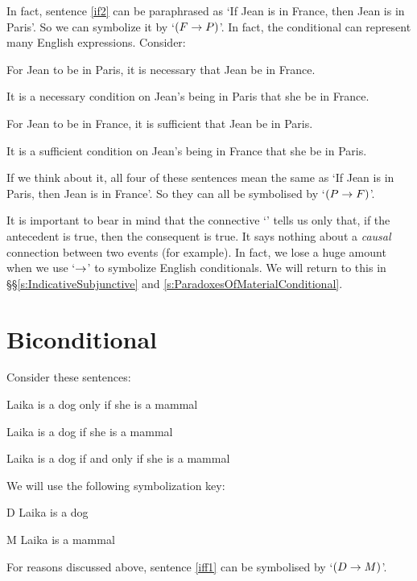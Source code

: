 In fact, sentence \ref{if2} can be paraphrased as `If Jean is in France, then Jean is in Paris'. So we can symbolize it by `$(F \rightarrow P)$'.
\noindent In fact, the conditional can represent many English expressions. Consider: 	\begin{earg}
		\item[\ex{ifnec1}] For Jean to be in Paris, it is necessary that Jean be in France.
		\item[\ex{ifnec2}] It is a necessary condition on Jean's being in Paris that she be in France.
		\item[\ex{ifsuf1}] For Jean to be in France, it is sufficient that Jean be in Paris.
		\item[\ex{ifsuf2}] It is a sufficient condition on Jean's being in France that she be in Paris.
	\end{earg}
If we think about it, all four of these sentences mean the same as  `If Jean is in Paris, then Jean is in France'. So they can all be symbolised by `$(P \rightarrow F)$'.

It is important to bear in mind that the connective `\eif' tells us only that, if the antecedent is true, then the consequent is true. It says nothing about a \emph{causal} connection between two events (for example). In fact, we lose a huge amount when we use `$\rightarrow$' to symbolize English conditionals. We will return to this in \S\S\ref{s:IndicativeSubjunctive} and \ref{s:ParadoxesOfMaterialConditional}.

\section{Biconditional}
Consider these sentences:
	\begin{earg}
		\item[\ex{iff1}] Laika is a dog only if she is a mammal
		\item[\ex{iff2}] Laika is a dog if she is a mammal
		\item[\ex{iff3}] Laika is a dog if and only if she is a mammal
	\end{earg}
We will use the following symbolization key:
	\begin{ekey}
		\item[D] Laika is a dog
		\item[M] Laika is a mammal
	\end{ekey}
For reasons discussed above, sentence \ref{iff1} can be symbolised by `$(D \rightarrow M)$'.

